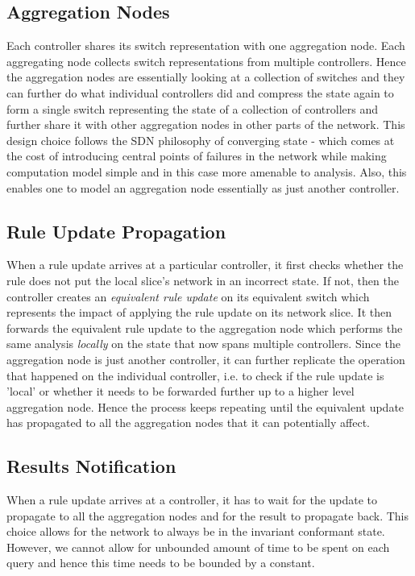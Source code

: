 \documentclass[a4paper,10pt]{article}
\begin{document}
\subsection{Aggregation Nodes}
Each controller shares its switch representation with one aggregation node. Each aggregating node collects switch representations from multiple controllers. Hence the aggregation nodes are essentially looking at a collection of switches and they can further do what individual controllers did and compress the state again to form a single switch representing the state of a collection of controllers and further share it with other aggregation nodes in other parts of the network. This design choice follows the SDN philosophy of converging state - which comes at the cost of introducing central points of failures in the network while making computation model simple and in this case more amenable to analysis. Also, this enables one to model an aggregation node essentially as just another controller.

\subsection{Rule Update Propagation}
When a rule update arrives at a particular controller, it first checks whether the rule does not put the local slice's network in an incorrect state. If not, then the controller creates an \textit{equivalent rule update} on its equivalent switch which represents the impact of applying the rule update on its network slice. It then forwards the equivalent rule update to the aggregation node which performs the same analysis \textit{locally} on the state that now spans multiple controllers. Since the aggregation node is just another controller, it can further replicate the operation that happened on the individual controller, i.e. to check if the rule update is 'local' or whether it needs to be forwarded further up to a higher level aggregation node. Hence the process keeps repeating until the equivalent update has propagated to all the aggregation nodes that it can potentially affect. 

\subsection{Results Notification}
When a rule update arrives at a controller, it has to wait for the update to propagate to all the aggregation nodes and for the result to propagate back. This choice allows for the network to always be in the invariant conformant state. However, we cannot allow for unbounded amount of time to be spent on each query and hence this time needs to be bounded by a constant. 
\end{document}
